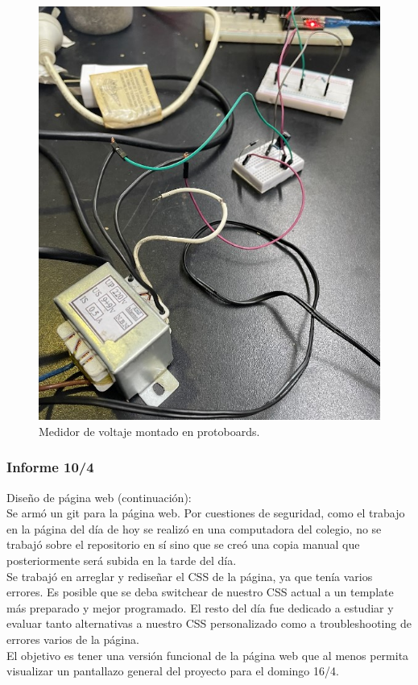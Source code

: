 \begin{figure}[H]
    \centering
    \includegraphics[width=0.75\linewidth]{informes/Screenshot_31.jpg}
    \caption{Medidor de voltaje montado en protoboards.}
    
\end{figure}

\subsubsection{Informe 10/4}

Diseño de página web (continuación):\\

Se armó un git para la página web. Por cuestiones de seguridad, como el trabajo en la página del día de hoy se realizó en una computadora del colegio, no se trabajó sobre el repositorio en sí sino que se creó una copia manual que posteriormente será subida en la tarde del día.\\

Se trabajó en arreglar y rediseñar el CSS de la página, ya que tenía varios errores. Es posible que se deba switchear de nuestro CSS actual a un template más preparado y mejor programado.
El resto del día fue dedicado a estudiar y evaluar tanto alternativas a nuestro CSS personalizado como a troubleshooting de errores varios de la página.\\

El objetivo es tener una versión funcional de la página web que al menos permita visualizar un pantallazo general del proyecto para el domingo 16/4.\\

